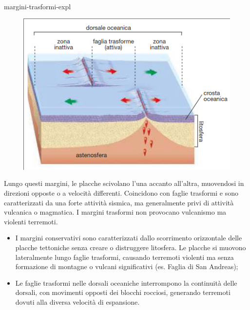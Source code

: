 \documentclass[preview]{standalone}
\begin{document}
\begin{snippet}{margini-trasformi-expl}
    \setlength{\intextsep}{0pt}%
    \begin{figure}
        \includegraphics[width=.45\textwidth]{resources/margini-trasformi.png}
    \end{figure}

    Lungo questi margini, le placche scivolano l'una accanto all'altra, muovendosi in
    direzioni opposte o a velocità differenti. Coincidono con faglie trasformi e sono
    caratterizzati da una forte attività sismica, ma generalmente privi di attività
    vulcanica o magmatica.
    I margini trasformi non provocano vulcanismo ma violenti terremoti.
    \wrapfill
    \vspace{-1cm}
    \begin{itemize}
        \item I margini conservativi sono caratterizzati dallo scorrimento orizzontale delle placche
            tettoniche senza creare o distruggere litosfera. Le placche si muovono lateralmente
            lungo faglie trasformi, causando terremoti violenti ma senza formazione di montagne o
            vulcani significativi (es. Faglia di San Andreas);
        \item Le faglie trasformi nelle dorsali oceaniche interrompono la continuità delle dorsali,
            con movimenti opposti dei blocchi rocciosi, generando terremoti dovuti alla diversa
            velocità di espansione.
    \end{itemize}
\end{snippet}
\end{document}
